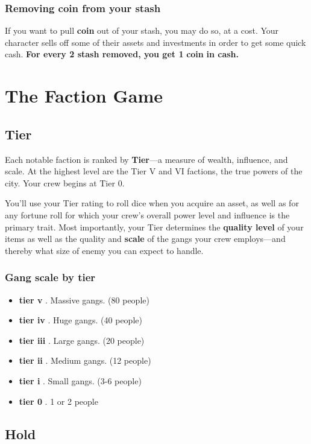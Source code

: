 \documentclass[11pt,fleqn,a5paper]{book}
\newcommand{\gameterm}[1]{\textbf{#1}}
\begin{document}
\subsection{Removing coin from your stash}

If you want to pull \gameterm{coin}  out of your stash, you may do so, at a cost. Your character sells off some of their assets and investments in order to get some quick cash. \textbf{For every 2 stash removed, you get 1 }\gameterm{coin} \textbf{ in cash.}

\chapter{The Faction Game}

\section{Tier}

Each notable faction is ranked by \textbf{Tier}---a measure of wealth, influence, and scale. At the highest level are the Tier V and VI factions, the true powers of the city. Your crew begins at Tier 0.

You’ll use your Tier rating to roll dice when you acquire an asset, as well as for any fortune roll for which your crew’s overall power level and influence is the primary trait. Most importantly, your Tier determines the \textbf{quality level} of your items as well as the quality and \textbf{scale} of the gangs your crew employs---and thereby what size of enemy you can expect to handle.

\subsection{Gang scale by tier}

\begin{itemize}
	\item \gameterm{tier v} . Massive gangs. (80 people)
	\item \gameterm{tier iv} . Huge gangs. (40 people)
	\item \gameterm{tier iii} . Large gangs. (20 people)
	\item \gameterm{tier ii} . Medium gangs. (12 people)
	\item \gameterm{tier i} . Small gangs. (3-6 people)
	\item \gameterm{tier 0} . 1 or 2 people
\end{itemize}

\section{Hold}
\end{document}
